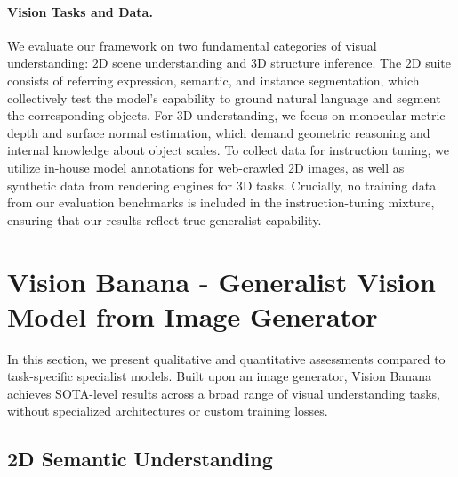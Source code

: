 \documentclass[11pt, a4paper, copyright, gdm]{google}
\begin{document}
\paragraph{Vision Tasks and Data.}
We evaluate our framework on two fundamental categories of visual understanding: $2$D scene understanding and $3$D structure inference. 
The $2$D suite consists of referring expression, semantic, and instance segmentation, which collectively test the model's capability to ground natural language and segment the corresponding objects. 
For $3$D understanding, we focus on monocular metric depth and surface normal estimation, which demand geometric reasoning and internal knowledge about object scales.
To collect data for instruction tuning, we utilize in-house model annotations for web-crawled 2D images, as well as synthetic data from rendering engines for 3D tasks. 
Crucially, no training data from our evaluation benchmarks is included in the instruction-tuning mixture, ensuring that our results reflect true generalist capability.

\newpage


\section{Vision Banana - Generalist Vision Model from Image Generator}


In this section, we present qualitative and quantitative assessments compared to task-specific specialist models.
Built upon an image generator,
Vision Banana achieves SOTA-level results across a broad range of visual understanding tasks, without specialized architectures or custom training losses.

\subsection{2D Semantic Understanding}
\end{document}
